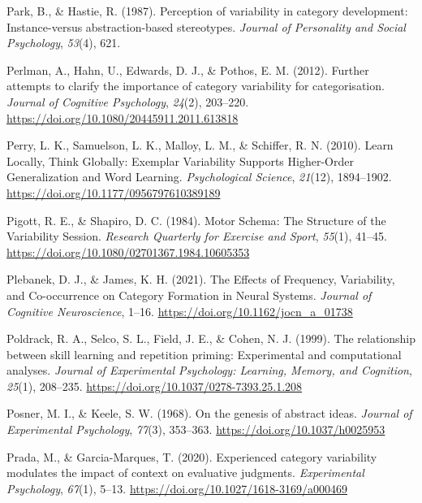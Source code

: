 \documentclass[
  11pt,
  letterpaper,
]{article}
\newlength{\cslhangindent}
\newenvironment{CSLReferences}[2] %
 {\begin{list}{}{%
  \setlength{\itemindent}{0pt}
  \setlength{\leftmargin}{0pt}
  \setlength{\parsep}{0pt}
  \ifodd #1
   \setlength{\leftmargin}{\cslhangindent}
   \setlength{\itemindent}{-1\cslhangindent}
  \fi
  \setlength{\itemsep}{#2\baselineskip}}}
 {\end{list}}
\begin{document}
\begin{CSLReferences}{1}{0}
Park, B., \& Hastie, R. (1987). Perception of variability in category
development: {Instance-versus} abstraction-based stereotypes.
\emph{Journal of Personality and Social Psychology}, \emph{53}(4), 621.

Perlman, A., Hahn, U., Edwards, D. J., \& Pothos, E. M. (2012). Further
attempts to clarify the importance of category variability for
categorisation. \emph{Journal of Cognitive Psychology}, \emph{24}(2),
203--220. \url{https://doi.org/10.1080/20445911.2011.613818}

Perry, L. K., Samuelson, L. K., Malloy, L. M., \& Schiffer, R. N.
(2010). Learn {Locally}, {Think Globally}: {Exemplar Variability
Supports Higher-Order Generalization} and {Word Learning}.
\emph{Psychological Science}, \emph{21}(12), 1894--1902.
\url{https://doi.org/10.1177/0956797610389189}

Pigott, R. E., \& Shapiro, D. C. (1984). Motor {Schema}: {The Structure}
of the {Variability Session}. \emph{Research Quarterly for Exercise and
Sport}, \emph{55}(1), 41--45.
\url{https://doi.org/10.1080/02701367.1984.10605353}

Plebanek, D. J., \& James, K. H. (2021). The {Effects} of {Frequency},
{Variability}, and {Co-occurrence} on {Category Formation} in {Neural
Systems}. \emph{Journal of Cognitive Neuroscience}, 1--16.
\url{https://doi.org/10.1162/jocn_a_01738}

Poldrack, R. A., Selco, S. L., Field, J. E., \& Cohen, N. J. (1999). The
relationship between skill learning and repetition priming:
{Experimental} and computational analyses. \emph{Journal of Experimental
Psychology: Learning, Memory, and Cognition}, \emph{25}(1), 208--235.
\url{https://doi.org/10.1037/0278-7393.25.1.208}

Posner, M. I., \& Keele, S. W. (1968). On the genesis of abstract ideas.
\emph{Journal of Experimental Psychology}, \emph{77}(3), 353--363.
\url{https://doi.org/10.1037/h0025953}

Prada, M., \& Garcia-Marques, T. (2020). Experienced category
variability modulates the impact of context on evaluative judgments.
\emph{Experimental Psychology}, \emph{67}(1), 5--13.
\url{https://doi.org/10.1027/1618-3169/a000469}


\end{CSLReferences}
\end{document}
